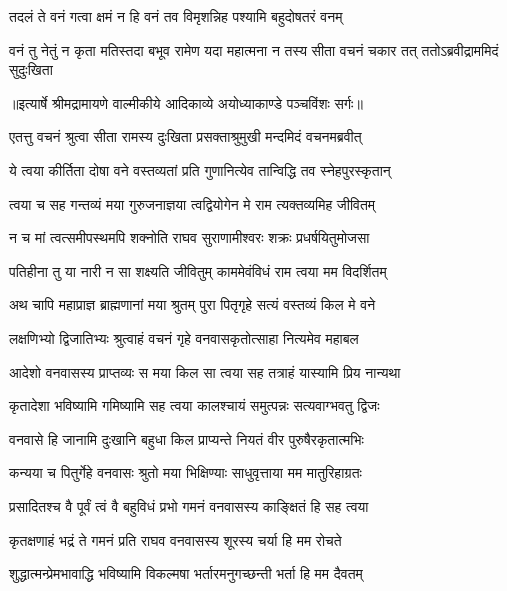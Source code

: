 \twolineshloka
{तदलं ते वनं गत्वा क्षमं न हि वनं तव}
{विमृशन्निह पश्यामि बहुदोषतरं वनम्} %

\fourlineindentedshloka
{वनं तु नेतुं न कृता मतिस्तदा}
{बभूव रामेण यदा महात्मना}
{न तस्य सीता वचनं चकार तत्}
{ततोऽब्रवीद्राममिदं सुदुःखिता} %


{॥इत्यार्षे श्रीमद्रामायणे वाल्मीकीये आदिकाव्ये अयोध्याकाण्डे पञ्चविंशः सर्गः॥}


\twolineshloka
{एतत्तु वचनं श्रुत्वा सीता रामस्य दुःखिता}
{प्रसक्ताश्रुमुखी मन्दमिदं वचनमब्रवीत्} %

\twolineshloka
{ये त्वया कीर्तिता दोषा वने वस्तव्यतां प्रति}
{गुणानित्येव तान्विद्धि तव स्नेहपुरस्कृतान्} %

\twolineshloka
{त्वया च सह गन्तव्यं मया गुरुजनाज्ञया}
{त्वद्वियोगेन मे राम त्यक्तव्यमिह जीवितम्} %

\twolineshloka
{न च मां त्वत्समीपस्थमपि शक्नोति राघव}
{सुराणामीश्वरः शक्रः प्रधर्षयितुमोजसा} %

\twolineshloka
{पतिहीना तु या नारी न सा शक्ष्यति जीवितुम्}
{काममेवंविधं राम त्वया मम विदर्शितम्} %

\twolineshloka
{अथ चापि महाप्राज्ञ ब्राह्मणानां मया श्रुतम्}
{पुरा पितृगृहे सत्यं वस्तव्यं किल मे वने} %

\twolineshloka
{लक्षणिभ्यो द्विजातिभ्यः श्रुत्वाहं वचनं गृहे}
{वनवासकृतोत्साहा नित्यमेव महाबल} %

\twolineshloka
{आदेशो वनवासस्य प्राप्तव्यः स मया किल}
{सा त्वया सह तत्राहं यास्यामि प्रिय नान्यथा} %

\twolineshloka
{कृतादेशा भविष्यामि गमिष्यामि सह त्वया}
{कालश्चायं समुत्पन्नः सत्यवाग्भवतु द्विजः} %

\twolineshloka
{वनवासे हि जानामि दुःखानि बहुधा किल}
{प्राप्यन्ते नियतं वीर पुरुषैरकृतात्मभिः} %

\twolineshloka
{कन्यया च पितुर्गेहे वनवासः श्रुतो मया}
{भिक्षिण्याः साधुवृत्ताया मम मातुरिहाग्रतः} %

\twolineshloka
{प्रसादितश्च वै पूर्वं त्वं वै बहुविधं प्रभो}
{गमनं वनवासस्य काङ्क्षितं हि सह त्वया} %

\twolineshloka
{कृतक्षणाहं भद्रं ते गमनं प्रति राघव}
{वनवासस्य शूरस्य चर्या हि मम रोचते} %

\twolineshloka
{शुद्धात्मन्प्रेमभावाद्धि भविष्यामि विकल्मषा}
{भर्तारमनुगच्छन्ती भर्ता हि मम दैवतम्} %

